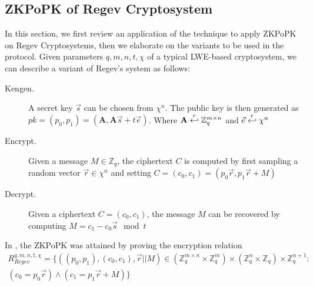 \subsection{ZKPoPK of Regev Cryptosystem}
\label{sec:zkpRegev}
In this section, we first review an application of the \cite{ling2013improved} technique to apply ZKPoPK on Regev Cryptosystems, then we elaborate on the variants to be used in the protocol.
Given parameters $q, m, n, t, \chi$ of a typical LWE-based cryptosystem, we can describe a variant of Regev's system as follows:
\begin{description}
\item [Kengen.] A secret key $\vec{s}$ can be chosen from $\chi^n$. The public key is then generated as
  $pk = (p_0, p_1) = (\mathbf{A}, \mathbf{A}\vec{s} + t\vec{e})$. Where $\mathbf{A} \stackrel{r}{\hookleftarrow} \mathbb{Z}_q^{m \times n}$
  and $\vec{e} \stackrel{r}{\hookleftarrow} \chi^n$
\item [Encrypt.] Given a message $M \in \mathbb{Z}_q$, the ciphertext $C$ is computed by first sampling a random
  vector $\vec{r} \in \chi^n$ and setting
  $C = (c_0, c_1) = (p_0\vec{r}, p_1\vec{r} + M)$
\item [Decrypt.] Given a ciphertext $C = (c_0, c_1)$, the message $M$ can be recovered by computing $M = c_1 - c_0\vec{s} \mod t$
\end{description}
In \cite{ling2013improved}, the ZKPoPK was attained by proving the encryption relation
\begin{align*}
  R_{Regev}^{q,m,n,t,\chi} = \{ ((p_0,p_1),(c_0,c_1),\vec{r}||M) \in (\mathbb{Z}_q^{m \times n} \times \mathbb{Z}_q^{m})
  \times (\mathbb{Z}_q^n \times \mathbb{Z}_q) \times \mathbb{Z}_q^{n+1} : \\
  (c_0 = p_0\vec{r}) \land (c_1 = p_1\vec{r} + M) \}
\end{align*}

